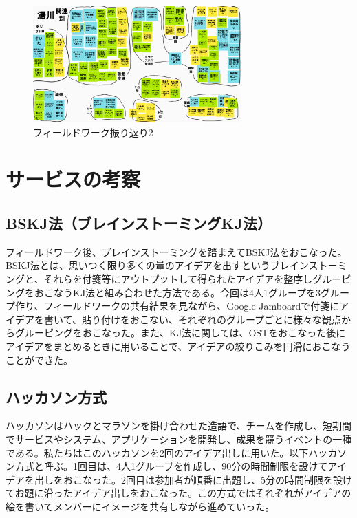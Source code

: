 \begin{figure}[htbp]
    \begin{center}
    \includegraphics[width=8cm]{images/FW2.png}
    \end{center}
    \caption{フィールドワーク振り返り2}
    \label{fig:furikaeri2}
\end{figure}


\section{サービスの考察}

\subsection{BSKJ法（ブレインストーミングKJ法）}
フィールドワーク後、ブレインストーミングを踏まえてBSKJ法をおこなった。BSKJ法とは、思いつく限り多くの量のアイデアを出すというブレインストーミングと、それらを付箋等にアウトプットして得られたアイデアを整序しグルーピングをおこなうKJ法と組み合わせた方法である。今回は4人1グループを3グループ作り、フィールドワークの共有結果を見ながら、Google Jamboardで付箋にアイデアを書いて、貼り付けをおこない、それぞれのグループごとに様々な観点からグルーピングをおこなった。また、KJ法に関しては、OSTをおこなった後にアイデアをまとめるときに用いることで、アイデアの絞りこみを円滑におこなうことができた。

\subsection{ハッカソン方式}
ハッカソンはハックとマラソンを掛け合わせた造語で、チームを作成し、短期間でサービスやシステム、アプリケーションを開発し、成果を競うイベントの一種である。私たちはこのハッカソンを2回のアイデア出しに用いた。以下ハッカソン方式と呼ぶ。1回目は、4人1グループを作成し、90分の時間制限を設けてアイデアを出しをおこなった。2回目は参加者が順番に出題し、5分の時間制限を設けてお題に沿ったアイデア出しをおこなった。この方式ではそれぞれがアイデアの絵を書いてメンバーにイメージを共有しながら進めていった。

